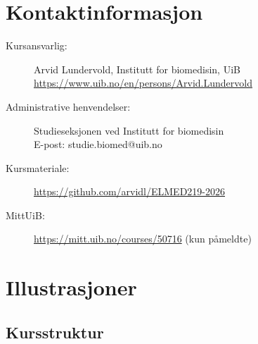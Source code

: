 \documentclass[11pt,a4paper]{article}
\begin{document}
\section{Kontaktinformasjon}

\begin{description}
    \item[Kursansvarlig:] Arvid Lundervold, Institutt for biomedisin, UiB\\
    \url{https://www.uib.no/en/persons/Arvid.Lundervold}
    
    \item[Administrative henvendelser:] Studieseksjonen ved Institutt for biomedisin\\
    E-post: studie.biomed@uib.no
    
    \item[Kursmateriale:] \url{https://github.com/arvidl/ELMED219-2026}
    
    \item[MittUiB:] \url{https://mitt.uib.no/courses/50716} (kun påmeldte)
\end{description}

\newpage



\appendix
\section{Illustrasjoner}

\subsection{Kursstruktur}
\end{document}
